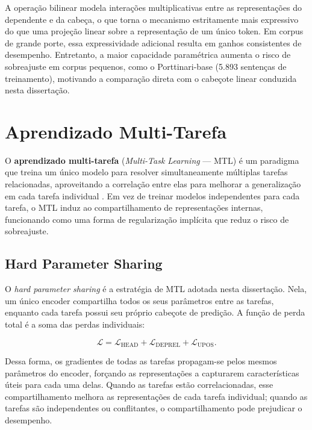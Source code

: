 A operação bilinear modela interações multiplicativas entre as representações do dependente
e da cabeça, o que torna o mecanismo estritamente mais expressivo do que uma projeção linear
sobre a representação de um único token. Em corpus de grande porte, essa expressividade
adicional resulta em ganhos consistentes de desempenho. Entretanto, a maior capacidade
paramétrica aumenta o risco de sobreajuste em corpus pequenos, como o Porttinari-base
(5.893 sentenças de treinamento), motivando a comparação direta com o cabeçote linear
conduzida nesta dissertação.

\section{Aprendizado Multi-Tarefa}
\label{sec:mtl}

O \textbf{aprendizado multi-tarefa} (\textit{Multi-Task Learning} — MTL) é um paradigma que
treina um único modelo para resolver simultaneamente múltiplas tarefas relacionadas,
aproveitando a correlação entre elas para melhorar a generalização em cada tarefa individual
\cite{caruana1997multitask}. Em vez de treinar modelos independentes para cada tarefa, o MTL
induz ao compartilhamento de representações internas, funcionando como uma forma de
regularização implícita que reduz o risco de sobreajuste.

\subsection{Hard Parameter Sharing}
\label{subsec:hard-sharing}

O \textit{hard parameter sharing} é a estratégia de MTL adotada nesta dissertação. Nela, um
único encoder compartilha todos os seus parâmetros entre as tarefas, enquanto cada tarefa
possui seu próprio cabeçote de predição. A função de perda total é a soma das perdas
individuais:

\begin{equation}
\mathcal{L} = \mathcal{L}_{\text{HEAD}} + \mathcal{L}_{\text{DEPREL}} + \mathcal{L}_{\text{UPOS}}.
\end{equation}

\noindent
Dessa forma, os gradientes de todas as tarefas propagam-se pelos mesmos parâmetros do encoder,
forçando as representações a capturarem características úteis para cada uma delas. Quando as
tarefas estão correlacionadas, esse compartilhamento melhora as representações de cada tarefa
individual; quando as tarefas são independentes ou conflitantes, o compartilhamento pode
prejudicar o desempenho.

